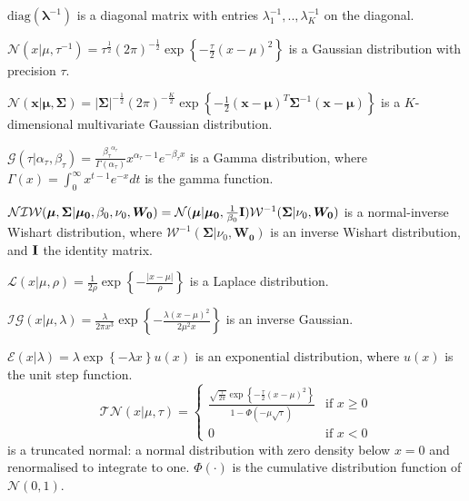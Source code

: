 \documentclass[letterpaper]{article} %
\begin{document}
		$\text{diag}(\boldsymbol \lambda^{-1})$ is a diagonal matrix with entries $\lambda_1^{-1}, .., \lambda_K^{-1}$ on the diagonal.
		
		$ \mathcal{N} (x|\mu,\tau^{-1}) = \tau^{\frac{1}{2}} (2\pi)^{-\frac{1}{2}} \exp \left\{ -\frac{\tau}{2} (x - \mu)^2 \right\} $ is a Gaussian distribution with precision $ \tau $. 
		
		$ \mathcal{N} (\boldsymbol x|\boldsymbol \mu,\boldsymbol \Sigma) = \vert \boldsymbol \Sigma \vert^{-\frac{1}{2}} (2\pi)^{-\frac{K}{2}} \exp \left\{ -\frac{1}{2} (\boldsymbol x - \boldsymbol \mu)^T \boldsymbol \Sigma^{-1} (\boldsymbol x - \boldsymbol \mu) \right\} $ is a $K$-dimensional multivariate Gaussian distribution.
		
		$ \mathcal{G} (\tau | \alpha_{\tau}, \beta_{\tau} ) = \frac{{\beta_{\tau}}^{\alpha_{\tau}}}{\Gamma(\alpha_{\tau})} x^{\alpha_{\tau} -1} e^{- \beta_{\tau} x} $ is a Gamma distribution, where $ \Gamma(x) = \int_{0}^{\infty} x^{t-1} e^{-x} dt $ is the gamma function. 
		
		$ \mathcal{NIW} ( \boldsymbol{\mu}, \boldsymbol{\Sigma} | \boldsymbol{\mu_0}, \beta_0, \nu_0, \boldsymbol{W_0} ) = \mathcal{N}(\boldsymbol \mu | \boldsymbol{\mu_0}, \frac{1}{\beta_0} \text{\textbf I} ) \mathcal{W}^{-1} ( \boldsymbol \Sigma | \nu_0, \boldsymbol{W_0} ) $ is a normal-inverse Wishart distribution, where $\mathcal{W}^{-1} ( \boldsymbol \Sigma | \nu_0, \boldsymbol{W_0} ) $ is an inverse Wishart distribution, and $\textbf I$ the identity matrix.
		
		$\mathcal{L} ( x | \mu, \rho ) = \frac{1}{2 \rho} \exp \left\{ -\frac{ |x - \mu| }{\rho} \right\} $ is a Laplace distribution.
		
		$ \mathcal{IG}(x|\mu, \lambda) = \frac{ \lambda }{2 \pi x^3} \exp \left\{ - \frac{\lambda (x - \mu)^2}{2 \mu^2 x} \right\} $ is an inverse Gaussian.
		
		$ \mathcal{E} ( x | \lambda ) = \lambda \exp \left\{ - \lambda x \right\} u(x) $ is an exponential distribution, where $u(x)$ is the unit step function.
		\begin{equation*}
			\mathcal{TN} ( x | \mu, \tau ) = \left\{
			\begin{array}{ll}
			\displaystyle \frac{ \sqrt{ \frac{\tau}{2\pi} } \exp \left\{ -\frac{\tau}{2} (x - \mu)^2 \right\} }{ 1 - \Phi ( - \mu \sqrt{\tau} )}  & \mbox{if } x \geq 0 \\
			0 & \mbox{if } x < 0
			\end{array}
			\right.
		\end{equation*}
		is a truncated normal: a normal distribution with zero density below $ x = 0 $ and renormalised to integrate to one. $ \Phi(\cdot) $ is the cumulative distribution function of $ \mathcal{N}(0,1) $.
\end{document}
